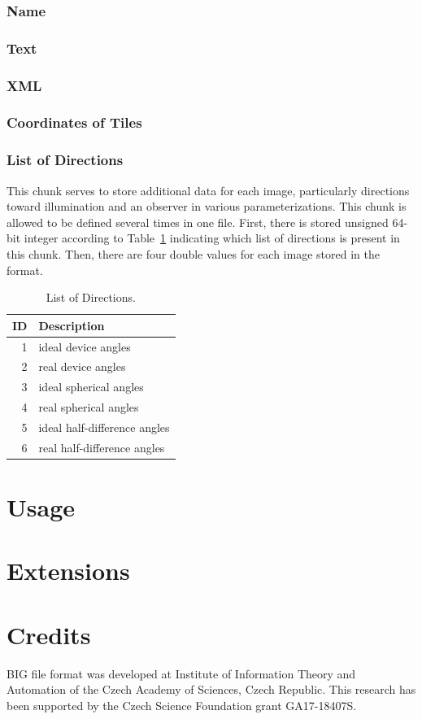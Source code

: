 \documentclass{article}
\begin{document}
\subsubsection{Name}

\subsubsection{Text}

\subsubsection{XML}

\subsubsection{Coordinates of Tiles}

\subsubsection{List of Directions}
This chunk serves to store additional data for each image, particularly directions toward illumination and an observer in various parameterizations. This chunk is allowed to be defined several times in one file. First, there is stored unsigned 64-bit integer according to Table~\ref{tab:directions} indicating which list of directions is present in this chunk. Then, there are four double values for each image stored in the format.

\begin{table}
\caption{\label{tab:directions}List of Directions.}
\begin{center}
\begin{tabular}{rl}
ID & Description \\
\hline
1 & ideal device angles \\
2 & real device angles \\
3 & ideal spherical angles \\
4 & real spherical angles \\
5 & ideal half-difference angles \\
6 & real half-difference angles \\
\end{tabular}
\end{center}
\end{table}


\section{Usage}

\section{Extensions}

\section{Credits}
BIG file format was developed at Institute of Information Theory and Automation of the Czech Academy of Sciences, Czech Republic. This research has been supported by the Czech Science Foundation grant GA17-18407S.
\end{document}
